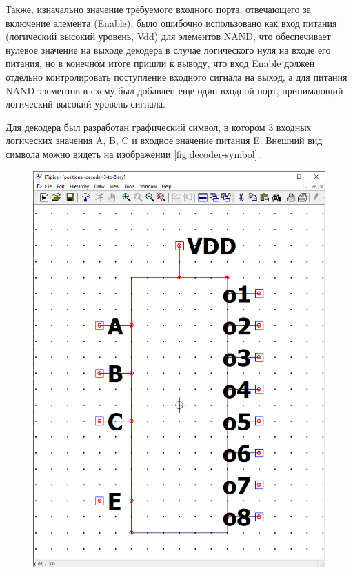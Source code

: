Также, изначально значение требуемого входного порта, отвечающего за включение
элемента (Enable), было ошибочно использовано как вход питания (логический высокий
уровень, Vdd) для элементов NAND, что обеспечивает нулевое значение на выходе
декодера в случае логического нуля на входе его питания, но в конечном итоге
пришли к выводу, что вход Enable должен отдельно контролировать поступление
входного сигнала на выход, а для питания NAND элементов в схему был добавлен еще один
входной порт, принимающий логический высокий уровень сигнала.

Для декодера был разработан графический символ, в котором 3 входных логических значения A, B, C и входное значение питания E. Внешний вид символа можно видеть на изображении \ref{fig:decoder-symbol}.
\begin{figure}[!htb]
    \centering
    \begin{minipage}[b]{0.3\textwidth}
        \centering
        \includegraphics[width=\textwidth]{res/3-to-8-decoder_symbol.png}

\end{minipage}
\end{figure}
